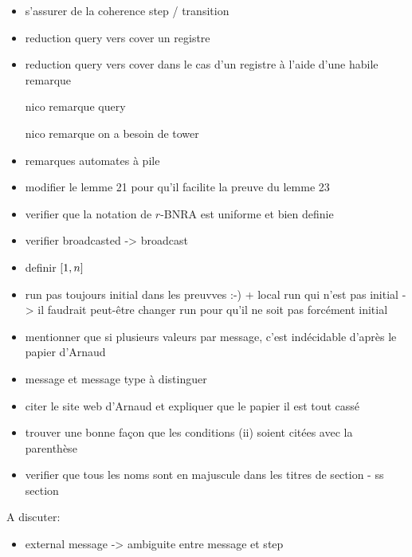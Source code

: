 \begin{itemize}
	\item s'assurer de la coherence step / transition
    \item reduction query vers cover un registre
    \item reduction query vers cover dans le cas d'un registre à l'aide d'une habile remarque
    \item[nico] remarque query 
    \item[nico] remarque on a besoin de tower
    \item remarques automates à pile
    \item modifier le lemme 21 pour qu'il facilite la preuve du lemme 23
    \item verifier que la notation de $r$-BNRA est uniforme et bien definie
    \item  verifier broadcasted -> broadcast
    \item definir $[1,n]$
    \item run pas toujours initial dans les preuvves :-) + local run qui n'est pas initial -> il faudrait peut-être changer run pour qu'il ne soit pas forcément initial
    \item mentionner que si plusieurs valeurs par message, c'est indécidable d'après le papier d'Arnaud
    \item message et message type à distinguer 
    \item citer le site web d'Arnaud et expliquer que le papier il est tout cassé
    \item trouver une bonne façon que les conditions (ii) soient citées avec la parenthèse
    \item verifier que tous les noms sont en majuscule dans les titres de section - ss section
\end{itemize}

A discuter:
\begin{itemize}
\item external message -> ambiguite entre message et step 
\end{itemize}